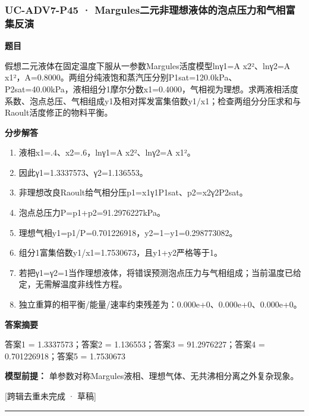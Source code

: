 \documentclass[UTF8,11pt,a4paper]{ctexart}
\begin{document}
\subsubsection*{UC-ADV7-P45 · Margules二元非理想液体的泡点压力和气相富集反演}
\noindent\textbf{题目}\par
假想二元液体在固定温度下服从一参数Margules活度模型lnγ1=A x2²、lnγ2=A x1²，A=0.8000。两组分纯液饱和蒸汽压分别P1sat=120.0kPa、P2sat=40.00kPa，液相组分1摩尔分数x1=0.4000，气相视为理想。求两液相活度系数、泡点总压、气相组成y1及相对挥发富集倍数y1/x1；检查两组分分压求和与Raoult活度修正的物料平衡。\par
\medskip\noindent\textbf{分步解答}
\begin{enumerate}
\item 液相x1=.4、x2=.6，lnγ1=A x2²、lnγ2=A x1²。
\item 因此γ1=1.3337573、γ2=1.136553。
\item 非理想改良Raoult给气相分压p1=x1γ1P1sat、p2=x2γ2P2sat。
\item 泡点总压力P=p1+p2=91.2976227kPa。
\item 理想气相y1=p1/P=0.701226918，y2=1−y1=0.298773082。
\item 组分1富集倍数y1/x1=1.7530673，且y1+y2严格等于1。
\item 若把γ1=γ2=1当作理想液体，将错误预测泡点压力与气相组成；当前温度已给定，无需解温度非线性方程。
\item 独立重算的相平衡/能量/速率约束残差为：0.000e+0、0.000e+0、0.000e+0。
\end{enumerate}
\noindent\textbf{答案摘要}\par
答案1 = 1.3337573；答案2 = 1.136553；答案3 = 91.2976227；答案4 = 0.701226918；答案5 = 1.7530673\par
\noindent\textbf{模型前提：}
单参数对称Margules液相、理想气体、无共沸相分离之外复杂现象。\par
\noindent\textcolor{red!65!black}{[跨辑去重未完成 · 草稿]} \par
\medskip\hrule\medskip
{}
\end{document}
